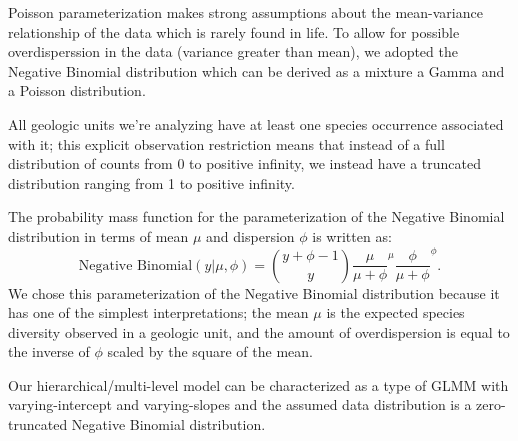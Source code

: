 \documentclass[12pt,letterpaper]{article}
\begin{document}
Poisson parameterization makes strong assumptions about the mean-variance relationship of the data which is rarely found in life. To allow for possible overdisperssion in the data (variance greater than mean), we adopted the Negative Binomial distribution which can be derived as a mixture a Gamma and a Poisson distribution.

All geologic units we're analyzing have at least one species occurrence associated with it; this explicit observation restriction means that instead of a full distribution of counts from 0 to positive infinity, we instead have a truncated distribution ranging from 1 to positive infinity.

The probability mass function for the parameterization of the Negative Binomial distribution in terms of mean \(\mu\) and dispersion \(\phi\) is written as:
\begin{equation}
  \text{Negative Binomial}(y | \mu, \phi) = \binom{y + \phi - 1}{y} \frac{\mu}{\mu + \phi}^{\mu} \frac{\phi}{\mu + \phi}^{\phi}.
\end{equation}
We chose this parameterization of the Negative Binomial distribution because it has one of the simplest interpretations; the mean \(\mu\) is the expected species diversity observed in a geologic unit, and the amount of overdispersion is equal to the inverse of \(\phi\) scaled by the square of the mean. 

Our hierarchical/multi-level model can be characterized as a type of GLMM with varying-intercept and varying-slopes and the assumed data distribution is a zero-truncated Negative Binomial distribution.
\end{document}
